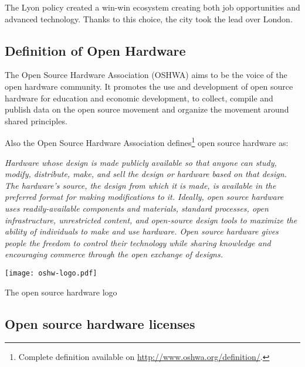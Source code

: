 The Lyon policy created a win-win ecosystem creating both job opportunities and advanced technology. Thanks to this choice, the city took the lead over London.

\subsection{Definition of Open Hardware } %

The Open Source Hardware Association (OSHWA) aims to be the voice of the open hardware community. It promotes the use and development of open source hardware for education and economic development, to collect, compile and publish data on the open source movement and organize the movement around shared principles.

Also the Open Source Hardware Association defines\footnote{Complete definition available on \url{http://www.oshwa.org/definition/}.} open source hardware as:

\begin{row}{4}{2}
    \begin{cell}{3}
        \emph{Hardware whose design is made publicly available so that anyone can study, modify, distribute, make, and sell the design or hardware based on that design. The hardware’s source, the design from which it is made, is available in the preferred format for making modifications to it. Ideally, open source hardware uses readily-available components and materials, standard processes, open infrastructure, unrestricted content, and open-source design tools to maximize the ability of individuals to make and use hardware. Open source hardware gives people the freedom to control their technology while sharing knowledge and encouraging commerce through the open exchange of designs.}
    \end{cell}
    \begin{cell}{1}
        \begin{NFfigure}
            \centering
                \texttt{[image: oshw-logo.pdf]}
            \caption{The open source hardware logo}
            \label{fig:ohw-logo}
        \end{NFfigure}
    \end{cell}
\end{row}


\subsection{Open source hardware licenses} %

